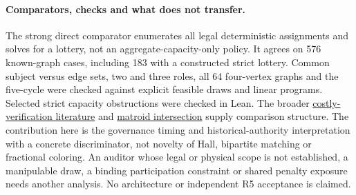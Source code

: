 \documentclass[11pt]{article}
\begin{document}
\paragraph{Comparators, checks and what does not transfer.}
The strong direct comparator enumerates all legal deterministic
assignments and solves for a lottery, not an aggregate-capacity-only
policy. It agrees on 576 known-graph cases, including 183 with a
constructed strict lottery. Common subject versus edge sets, two and
three roles, all 64 four-vertex graphs and the five-cycle were checked
against explicit feasible draws and linear programs. Selected strict
capacity obstructions were checked in Lean. The broader
\href{https://economics.sas.upenn.edu/sites/default/files/filevault/SSRN%2016_009%20third%20version.pdf}
{costly-verification literature} and
\href{https://www.sciencedirect.com/science/article/pii/S0167506008708173}
{matroid intersection} supply comparison structure. The contribution
here is the governance timing and historical-authority interpretation
with a concrete discriminator, not novelty of Hall, bipartite matching
or fractional coloring. An auditor whose legal or physical scope
is not established, a manipulable draw, a binding participation
constraint or shared penalty exposure needs another analysis. No
architecture or independent R5 acceptance is claimed.
\end{document}
